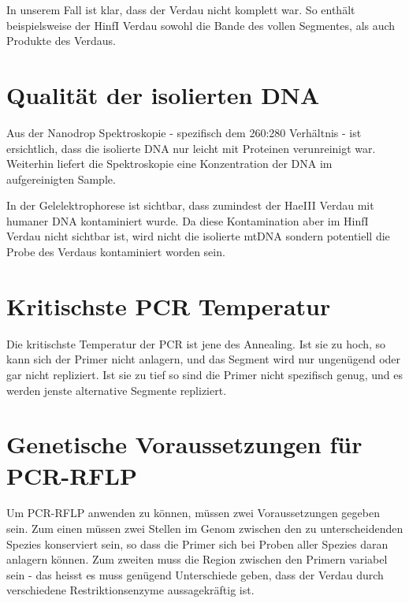 \documentclass[a4paper,english]{scrreprt}
\begin{document}
In unserem Fall ist klar, dass der Verdau nicht komplett war. So enthält
beispielsweise der HinfI Verdau sowohl die Bande des vollen Segmentes, als auch
Produkte des Verdaus.

\section{Qualität der isolierten DNA}

Aus der Nanodrop Spektroskopie - spezifisch dem 260:280 Verhältnis - ist
ersichtlich, dass die isolierte DNA nur leicht mit Proteinen verunreinigt war.
Weiterhin liefert die Spektroskopie eine Konzentration der DNA im
aufgereinigten Sample.

In der Gelelektrophorese ist sichtbar, dass zumindest der HaeIII Verdau mit
humaner DNA kontaminiert wurde. Da diese Kontamination aber im HinfI Verdau
nicht sichtbar ist, wird nicht die isolierte mtDNA sondern potentiell die Probe
des Verdaus kontaminiert worden sein.

\section{Kritischste PCR Temperatur}

Die kritischste Temperatur der PCR ist jene des Annealing. Ist sie zu hoch, so
kann sich der Primer nicht anlagern, und das Segment wird nur ungenügend oder
gar nicht repliziert. Ist sie zu tief so sind die Primer nicht spezifisch
genug, und es werden jenste alternative Segmente repliziert.

\section{Genetische Voraussetzungen für PCR-RFLP}

Um PCR-RFLP anwenden zu können, müssen zwei Voraussetzungen gegeben sein. Zum
einen müssen zwei Stellen im Genom zwischen den zu unterscheidenden Spezies
konserviert sein, so dass die Primer sich bei Proben aller Spezies daran
anlagern können. Zum zweiten muss die Region zwischen den Primern variabel sein
- das heisst es muss genügend Unterschiede geben, dass der Verdau durch
verschiedene Restriktionsenzyme aussagekräftig ist.



\end{document}
